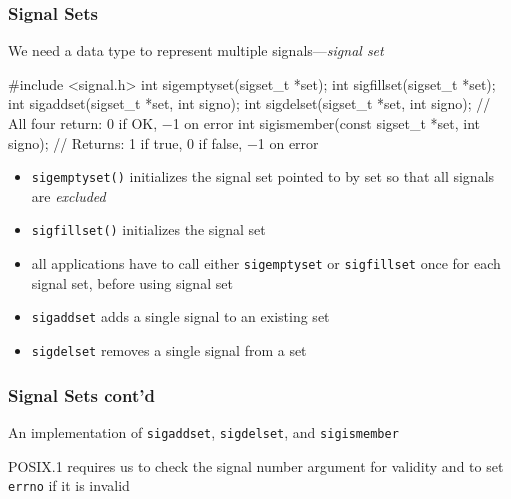 \documentclass[newPxFont,sthlmFooter,nooffset]{beamer}
\begin{document}
\begin{frame}[fragile,t]
  \frametitle{Signal Sets}
We need a data type to represent multiple signals---\textit{signal set}

\begin{codedef}
#include <signal.h>
int sigemptyset(sigset_t *set);
int sigfillset(sigset_t *set);
int sigaddset(sigset_t *set, int signo);
int sigdelset(sigset_t *set, int signo);
// All four return: 0 if OK, −1 on error
int sigismember(const sigset_t *set, int signo);
// Returns: 1 if true, 0 if false, −1 on error
\end{codedef}

\begin{itemize}
\item \footnotesize \texttt{sigemptyset()} initializes the signal set pointed to by set so that all signals are \textit{excluded}
\item \footnotesize \texttt{sigfillset()} initializes the signal set
\item \footnotesize all applications have to call either \texttt{sigemptyset} or \texttt{sigfillset} once for each signal set, before using signal set
\item \footnotesize \texttt{sigaddset} adds a single signal to an existing set
\item \footnotesize \texttt{sigdelset} removes a single signal from a set
\end{itemize}

\end{frame}








\begin{frame}
  \frametitle{Signal Sets cont'd}
An implementation of \texttt{sigaddset}, \texttt{sigdelset}, and \texttt{sigismember}


POSIX.1 requires us to check the signal number argument for validity and to set \texttt{errno} if it is invalid
\end{frame}
\end{document}
